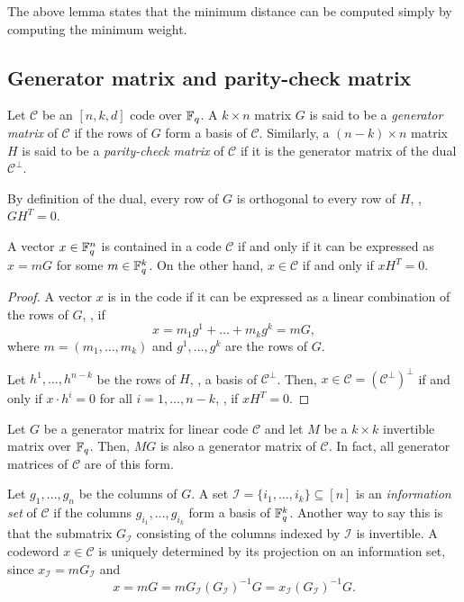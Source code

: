\documentclass[../main.tex]{subfiles}
\begin{document}
The above lemma states that the minimum distance can be computed simply by computing the minimum weight.

\subsection{Generator matrix and parity-check matrix}

Let $\mathcal{C}$ be an $[n, k, d]$ code over $\mathbb{F}_q$. A $k \times n$ matrix $G$ is said to be a \emph{generator matrix} of $\mathcal{C}$ if the rows of $G$ form a basis of $\mathcal{C}$. Similarly, a $(n - k) \times n$ matrix $H$ is said to be a \emph{parity-check matrix} of $\mathcal{C}$ if it is the generator matrix of the dual $\mathcal{C}^\perp$.

By definition of the dual, every row of $G$ is orthogonal to every row of $H$, \ie, $GH^T = 0$.

\begin{lemma}\label{lem:code_containment}
A vector $x \in \mathbb{F}_q^n$ is contained in a code $\mathcal{C}$ if and only if it can be expressed as $x = mG$ for some $m \in \mathbb{F}_q^k$. On the other hand, $x \in \mathcal{C}$ if and only if $xH^T = 0$.
\end{lemma}

\begin{proof}
A vector $x$ is in the code if it can be expressed as a linear combination of the rows of $G$, \ie, if
\begin{equation*}
    x = m_1 g^1 + \dots + m_k g^k = mG,
\end{equation*}
where $m = (m_1, \dots, m_k)$ and $g^1, \dots, g^k$ are the rows of $G$.

Let $h^1, \dots, h^{n-k}$ be the rows of $H$, \ie, a basis of $\mathcal{C}^\perp$. Then, $x \in \mathcal{C} = (\mathcal{C}^\perp)^\perp$ if and only if $x \cdot h^i = 0$ for all $i = 1, \dots, n - k$, \ie, if $xH^T = 0$.
\end{proof}

Let $G$ be a generator matrix for linear code $\mathcal{C}$ and let $M$ be a $k \times k$ invertible matrix over $\mathbb{F}_q$. Then, $MG$ is also a generator matrix of $\mathcal{C}$. In fact, all generator matrices of $\mathcal{C}$ are of this form.

Let $g_1, \dots, g_n$ be the columns of $G$. A set $\mathcal{I} = \{i_1, \dots, i_k\} \subseteq [n]$ is an \emph{information set} of $\mathcal{C}$ if the columns $g_{i_1}, \dots, g_{i_k}$ form a basis of $\mathbb{F}_q^k$. Another way to say this is that the submatrix $G_\mathcal{I}$ consisting of the columns indexed by $\mathcal{I}$ is invertible. A codeword $x \in \mathcal{C}$ is uniquely determined by its projection on an information set, since $x_\mathcal{I} = mG_\mathcal{I}$ and
\begin{equation*}
    x = mG = mG_\mathcal{I}(G_\mathcal{I})^{-1}G = x_\mathcal{I}(G_\mathcal{I})^{-1}G.
\end{equation*}
\end{document}
